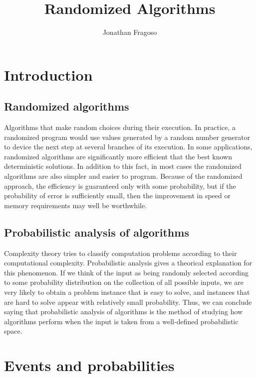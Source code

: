 \documentclass{book}
\title{Randomized Algorithms}
\author{Jonathan Fragoso}
\begin{document}
\maketitle

%

\tableofcontents

\chapter{Introduction}
\section{Randomized algorithms}
Algorithms that make random choices during their execution. In practice, a randomized program would use values generated by a random number generator to device the next step at several branches of its execution. 
\newline 
In some applications, randomized algorithms are significantly more efficient that the best known deterministic solutions. In addition to this fact, in most cases the randomized algorithms are also simpler and easier to program.
\newline
\newline
Because of the randomized approach, the efficiency is guaranteed only with some probability, but if the probability of error is sufficiently small, then the improvement in speed or memory requirements may well be worthwhile.
\section{Probabilistic analysis of algorithms}
Complexity theory tries to classify computation problems according to their computational complexity. Probabilistic analysis gives a theorical explanation for this phenomenon. If we think of the input as being randomly selected according to some probability distribution on the collection of all possible inputs, we are very likely to obtain a problem instance that is easy to solve, and instances that are hard to solve appear with relatively small probability. Thus, we can conclude saying that probabilistic analysis of algorithms is the method of studying how algorithms perform when the input is taken from a well-defined probabilistic space.

\chapter{Events and probabilities}
\end{document}
